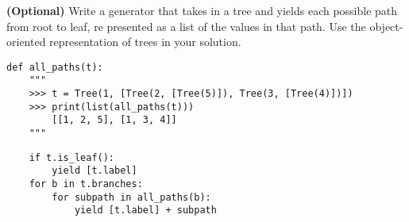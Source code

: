 \question \textbf{(Optional)} Write a generator that takes in a tree and yields each possible path from root to leaf, re
presented as a list of the values in that path. Use the object-oriented representation of trees in your solution.
\newline

\begin{lstlisting}
def all_paths(t):
    """
    >>> t = Tree(1, [Tree(2, [Tree(5)]), Tree(3, [Tree(4)])])
    >>> print(list(all_paths(t)))
        [[1, 2, 5], [1, 3, 4]]
    """
\end{lstlisting}

\begin{solution}[0.5in]
\begin{lstlisting}
    if t.is_leaf():
        yield [t.label]
    for b in t.branches:
        for subpath in all_paths(b):
            yield [t.label] + subpath
\end{lstlisting}
\end{solution}
